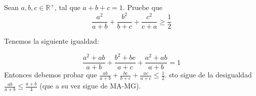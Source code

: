 \begin{ejer}
	Sean $a, b, c \in \mathbb{R}^{+}$, tal que $a+b+c = 1$. Pruebe que
	\begin{equation}
		\frac{a^{2}}{a+b} + \frac{b^{2}}{b+c} + \frac{c^{2}}{c+a} \geq \frac{1}{2}  
	\end{equation}
\end{ejer}

\begin{sol}
	Tenemos la siguiente igualdad:

	\begin{equation}
		\frac{a^{2} + ab}{a+b} + \frac{b^{2} + bc}{a+c} + \frac{a^{2} + ab}{a+b} = 1
	\end{equation}
	Entonces debemos probar que $\frac{ab}{a+b} + \frac{bc}{b+c} + \frac{ac}{a+c} \leq \frac{1}{2}$. sto sigue de la desigualdad $\frac{ab}{a+b} \leq \frac{a+b}{4}$ (que a su vez sigue de MA-MG).
\end{sol}



